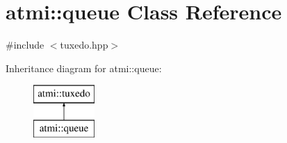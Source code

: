 \hypertarget{classatmi_1_1queue}{\section{atmi\+:\+:queue Class Reference}
\label{classatmi_1_1queue}
}


{\ttfamily \#include $<$tuxedo.\+hpp$>$}

Inheritance diagram for atmi\+:\+:queue\+:\begin{figure}[H]
\begin{center}
\leavevmode
\includegraphics[height=2.000000cm]{classatmi_1_1queue}
\end{center}
\end{figure}
